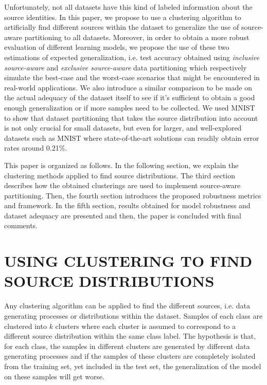 \documentclass[letterpaper]{article}
\begin{document}
Unfortunately, not all datasets have this kind of labeled information about the source identities. In this paper, we propose to use a clustering algorithm to artificially find different sources within the dataset to generalize the use of source-aware partitioning to all datasets. Moreover, in order to obtain a more robust evaluation of different learning models, we propose the use of these two estimations of expected generalization, i.e. test accuracy obtained using \textit{inclusive source-aware} and \textit{exclusive source-aware} data partitioning which respectively simulate the best-case and the worst-case scenarios that might be encountered in real-world applications. We also introduce a similar comparison to be made on the actual adequacy of the dataset itself to see if it's sufficient to obtain a good enough generalization or if more samples need to be collected.  We used MNIST \cite{lecun1998mnist} to show that dataset partitioning that takes the source distribution into account is not only crucial for small datasets, but even for larger, and well-explored datasets such as MNIST  where state-of-the-art solutions can readily obtain error rates around 0.21\%. 

This paper is organized as follows. In the following section, we explain the clustering methods applied to find source distributions. The third section describes how the obtained clusterings are used to implement source-aware partitioning. Then, the fourth section introduces the proposed robustness metrics and framework. In the fifth section, results obtained for model robustness and dataset adequacy are presented and then, the paper is concluded with final comments.

\section{USING CLUSTERING TO FIND SOURCE DISTRIBUTIONS}

Any clustering algorithm can be applied to find the different sources, i.e. data generating processes or distributions within the dataset. Samples of each class are clustered into $k$ clusters where each cluster is assumed to correspond to a different source distribution within the same class label. The hypothesis is that, for each class, the samples in different clusters are generated by different data generating processes and if the samples of these clusters are completely isolated from the training set, yet included in the test set, the generalization of the model on these samples will get worse.
\end{document}
